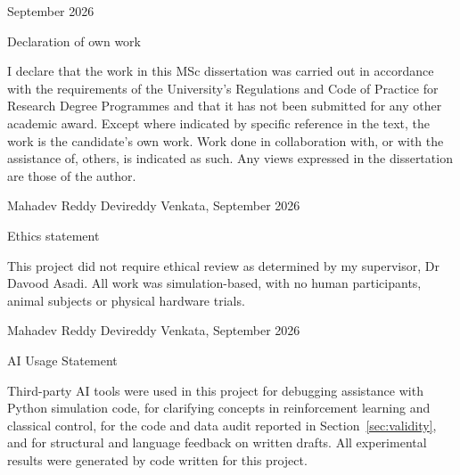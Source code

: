 \documentclass[a4paper, 10pt, conference]{ieeeconf}
\newcommand{\submissiondate}{September 2026}
\begin{document}
\begin{titlepage}
\begin{center}
        \vspace{0.6cm}
        \submissiondate
    \end{center}

    \newpage

    {\large{Declaration of own work}}

    I declare that the work in this MSc dissertation was carried
    out in accordance with the requirements of the University's
    Regulations and Code of Practice for Research Degree Programmes
    and that it has not been submitted for any other academic award.
    Except where indicated by specific reference in the text, the
    work is the candidate's own work. Work done in collaboration
    with, or with the assistance of, others, is indicated as such.
    Any views expressed in the dissertation are those of the author.

    \begin{flushright}
    Mahadev Reddy Devireddy Venkata, \submissiondate
    \end{flushright}

    \vspace{0.6cm}
    {\large{Ethics statement}}

    This project did not require ethical review as determined by my
    supervisor, Dr Davood Asadi. All work was simulation-based, with
    no human participants, animal subjects or physical hardware
    trials.

    \begin{flushright}
    Mahadev Reddy Devireddy Venkata, \submissiondate
    \end{flushright}

    \vspace{0.6cm}
    {\large{AI Usage Statement}}

    Third-party AI tools were used in this project for debugging
    assistance with Python simulation code, for clarifying concepts
    in reinforcement learning and classical control, for the code and
    data audit reported in Section~\ref{sec:validity}, and for
    structural and language feedback on written drafts. All
    experimental results were generated by code written for this
    project.


\end{titlepage}
\end{document}
